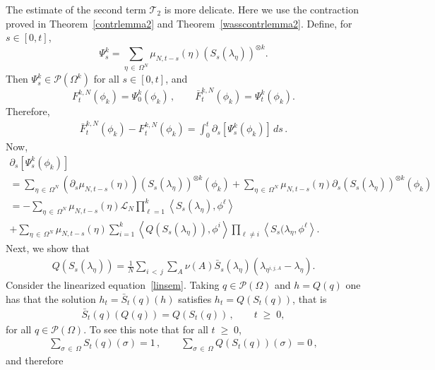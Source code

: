 \documentclass[10pt,a4paper]{article}
\renewcommand{\geq}{\;\geqslant\;}
\newcommand{\Om}{\Omega}
\newcommand{\cL}{\mathcal{L}}
\newcommand{\cP}{\mathcal{P}}
\newcommand{\cT}{\mathcal{T}}
\let\l=\lambda
\let\O=\Omega
\begin{document}
The estimate of the second term $\cT_2$ is more delicate. Here we use the contraction proved in Theorem~\ref{contrlemma2} and Theorem~\ref{wasscontrlemma2}. Define, for $s\in[0,t]$,
\[
\Psi^k_s = \sum_{\eta\,\in\,\O^N}\mu_{N,t-s}(\eta)(S_s(\l_{\eta}))^{\otimes k}.
\]
Then $\Psi^k_s\in\cP(\O^k)$ for all $s\in[0,t]$, and
\[
F_t^{k,N}(\phi_k)=\Psi^k_0(\phi_k)\,,\qquad \bar{F}_t^{k,N}(\phi_k)=\Psi^k_t(\phi_k).
\]
Therefore,
\begin{align}\label{eq:inpri}
\bar{F}_t^{k,N}(\phi_k) -F_t^{k,N}(\phi_k)= \int_0^t \partial_s \left[\Psi^k_s(\phi_k)\right] \,ds\,.
\end{align}
Now,
\begin{multline}\label{eq:inpria}
 \partial_s \left[\Psi^k_s(\phi_k)\right]\\
 =\sum_{\eta\,\in\,\O^N} (\partial_s\mu_{N,t-s}(\eta)) (S_s(\l_{\eta}))^{\otimes k}(\phi_k)
 + \sum_{\eta\,\in\,\O^N} \mu_{N,t-s}(\eta)\partial_s (S_s(\l_{\eta}))^{\otimes k}(\phi_k)\\
= -\sum_{\eta\,\in\,\O^N} \mu_{N,t-s}(\eta)\cL_N\prod_{\ell=1}^k\left\langle S_s(\l_{\eta}),\phi^\ell\right\rangle\\
 +
\sum_{\eta\,\in\,\O^N} \mu_{N,t-s}(\eta)
\sum_{i=1}^k\left\langle Q(S_s(\l_{\eta})),\phi^i\right\rangle\prod_{\ell\neq i}\left\langle S_s(\l_{\eta},\phi^\ell\right\rangle.
\end{multline}
Next, we show that
\begin{align}\label{eq:lintos}
Q(S_s(\l_{\eta})) =\frac1{N} \sum_{i\,<\,j}\sum_A\nu(A)\bar S_s(\l_\eta)\left(\l_{\eta^{i,j,A}} -\l_{\eta}\right).
\end{align}
Consider the linearized equation~\eqref{linsem}. Taking $q\in\cP(\O)$ and $h= Q(q)$ one has that the solution $h_t=\bar S_t(q)(h)$ satisfies $h_t = Q\left(S_t(q)\right)$, that is
\begin{align}\label{eq:qqq}
\bar S_t(q)(Q(q)) = Q\left(S_t(q)\right)\,,\qquad t\geq 0,
\end{align}
for all $q\in\cP(\O)$. To see this note that for all $t\geq 0$,
\begin{align*}
\sum_{\sigma\, \in\,\Om}S_t(q)(\sigma) = 1\,,\qquad \sum_{\sigma\,\in\,\Om}Q(S_t(q))(\sigma) = 0\,,
\end{align*}
and therefore
\end{document}
